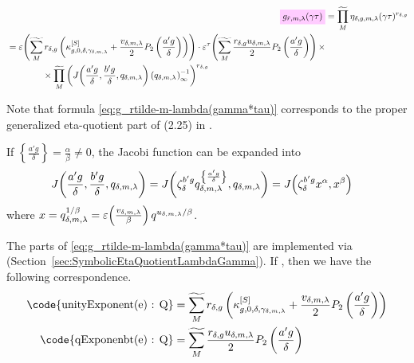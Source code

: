 \documentclass{article}
\begin{document}
\begin{align}
  \defineNotation[g-rtilde-gamma-m-lambda-tau]{g_{\tilde{r},m,\lambda}(\gamma\tau)}
  &=
    \genprod[M]
    \eta_{\delta,g,m,\lambda}(\gamma\tau)^{r_{\delta,g}}
  \notag\\
  \begin{split}
  &=
    \unityPower{
      \gensum[M]
      r_{\delta,g}
      \left(
      \kappa_{g,0,\delta,\gamma_{\delta,m,\lambda}}^{[S]}
      +
      \frac{v_{\delta,m,\lambda}}{2} P_2\left(\frac{a' g}{\delta}\right)
      \right)}
  \cdot
  \unityPowerTau{
    \gensum[M]
    \frac{r_{\delta,g} u_{\delta,m,\lambda}}{2} P_2\left(\frac{a' g}{\delta}\right)}
  \times
  \\
  &\qquad\qquad
  \times
  \genprod[M]
  \left(
    \jacobiAlpha{\frac{a' g}{\delta}}{\frac{b' g}{\delta}}{q_{\delta,m,\lambda}}
    \eulerFunction[q_{\delta,m,\lambda}]{}^{-1}
  \right)^{r_{\delta,g}}
  \end{split}
  \label{eq:g_rtilde-m-lambda(gamma*tau)}
\end{align}

Note that formula \eqref{eq:g_rtilde-m-lambda(gamma*tau)} corresponds
to the proper generalized eta-quotient part of (2.25) in
\cite{ChenDuZhao_FindingModularFunctionsRamanujan_2019}.

If $\left\{\frac{a'g}{\delta}\right\} = \frac{\alpha}{\beta} \ne 0$,
the Jacobi function can be expanded into
\begin{align}
  J\!\left(\frac{a' g}{\delta},\frac{b' g}{\delta},q_{\delta,m,\lambda}\right)
  &=
  J\!\left(
      \zeta_\delta^{b' g} q_{\delta,m,\lambda}^{\left\{\frac{a' g}{\delta}\right\}}
      ,q_{\delta,m,\lambda}\right)
  =
    J\!\left(\zeta_\delta^{b' g} x^{\alpha},x^{\beta}\right)
    \label{eq:minimalRootOfUnity-g_rtilde-m-lambda}
\end{align}
where
$x = q_{\delta,m,\lambda}^{1/\beta} =
\varepsilon\!\left(\frac{v_{\delta,m,\lambda}}{\beta}\right) q^{u_{\delta,m,\lambda}/\beta}$.




The parts of \eqref{eq:g_rtilde-m-lambda(gamma*tau)} are
implemented via
\textcolor{blue}{}
(Section~\ref{sec:SymbolicEtaQuotientLambdaGamma}).
%
If , then
we have the following correspondence.
\begin{align*}
  \text{\code{unityExponent(e) : Q}}
  &=
    \gensum[M]
    r_{\delta,g}
    \left(
    \kappa_{g,0,\delta,\gamma_{\delta,m,\lambda}}^{[S]}
    +
    \frac{v_{\delta,m,\lambda}}{2} P_2\left(\frac{a' g}{\delta}\right)
    \right)
  \\
  \text{\code{qExponenbt(e) : Q}}
  &=
    \gensum[M]
    \frac{r_{\delta,g} u_{\delta,m,\lambda}}{2} P_2\left(\frac{a' g}{\delta}\right)
\end{align*}
\end{document}
